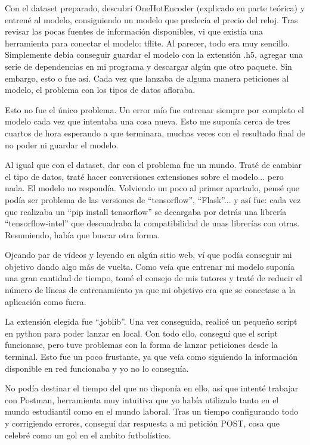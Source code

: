 	Con el dataset preparado, descubrí OneHotEncoder (explicado en parte teórica) y entrené al modelo, consiguiendo un modelo que predecía el precio del reloj. Tras revisar las pocas fuentes de información disponibles, vi que existía una herramienta para conectar el modelo: tflite. Al parecer, todo era muy sencillo. Simplemente debía conseguir guardar el modelo con la extensión .h5, agregar una serie de dependencias en mi programa y descargar algún que otro paquete. Sin embargo, esto o fue así. Cada vez que lanzaba de alguna manera peticiones al modelo, el problema con los tipos de datos afloraba.
	
	Esto no fue el único problema. Un error mío fue entrenar siempre por completo el modelo cada vez que intentaba una cosa nueva. Esto me suponía cerca de tres cuartos de hora esperando a que terminara, muchas veces con el resultado final de no poder ni guardar el modelo. 
	
	Al igual que con el dataset, dar con el problema fue un mundo. Traté de cambiar el tipo de datos, traté hacer conversiones extensiones sobre el modelo... pero nada. El modelo no respondía. Volviendo un poco al primer apartado, pensé que podía ser problema de las versiones de ``tensorflow'', ``Flask''... y así fue: cada vez que realizaba un ``pip install tensorflow'' se decargaba por detrás una librería ``tensorflow-intel'' que descuadraba la compatibilidad de unas librerías con otras. Resumiendo, había que buscar otra forma.
	
	Ojeando par de vídeos y leyendo en algún sitio web, ví que podía conseguir mi objetivo dando algo más de vuelta. Como veía que entrenar mi modelo suponía una gran cantidad de tiempo, tomé el consejo de mis tutores y traté de reducir el número de líneas de entrenamiento ya que mi objetivo era que se conectase a la aplicación como fuera.
	
	La extensión elegida fue ``.joblib''. Una vez conseguida, realicé un pequeño script en python para poder lanzar en local. Con todo ello, conseguí que el script funcionase, pero tuve problemas con la forma de lanzar peticiones desde la terminal. Esto fue un poco frustante, ya que veía como siguiendo la información disponible en red funcionaba y yo no lo conseguía.
	
	No podía destinar el tiempo del que no disponía en ello, así que intenté trabajar con Postman, herramienta muy intuitiva que yo había utilizado tanto en el mundo estudiantil como en el mundo laboral. Tras un tiempo configurando todo y corrigiendo errores, conseguí dar respuesta a mi petición POST, cosa que celebré como un gol en el ambito futbolístico.
	
